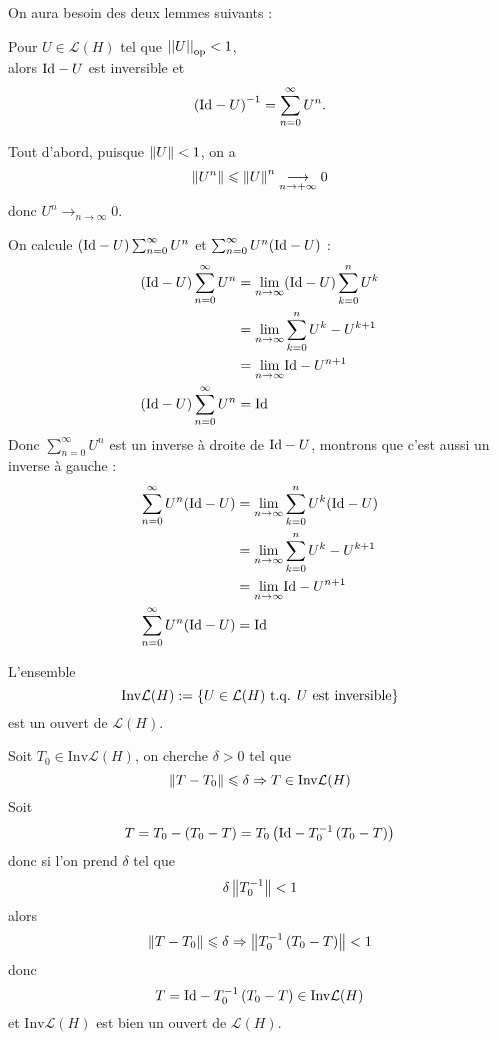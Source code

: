 \documentclass[a4paper,11pt, twoside]{article}
\begin{document}
On aura besoin des deux lemmes suivants : 


\begin{lemme}
  Pour $U\in\mathcal L(H)$ tel que $\left|\left|U\right|\right|_{\mathrm{op}}<1$,\\

  alors $\mathrm{Id}-U$ est inversible et 
  $$\left(\mathrm{Id}-U\right)^{-1}=\sum_{n=0}^{\infty}U^n.$$
\end{lemme}


\begin{Proof}
  Tout d'abord, puisque $\left\lVert U\right\rVert<1$, on a 
  $$\left\lVert U^n\right\rVert\leqslant \left\lVert U\right\rVert^n\underset{n\to+\infty}{\longrightarrow} 0$$
  donc $U^n\longrightarrow_{n\to\infty}0$.

  On calcule $(\mathrm{Id}-U)\sum_{n=0}^{\infty}U^n$ et $\sum_{n=0}^{\infty}U^n(\mathrm{Id}-U)$ :
  \begin{align*}
    (\mathrm{Id}-U)\sum_{n=0}^{\infty}U^n&=\underset{n\to\infty}{\mathrm{lim}} (\mathrm{Id}-U)\sum_{k=0}^{n}U^k\\
    &=\underset{n\to\infty}{\mathrm{lim}} \sum_{k=0}^{n}U^k-U^{k+1}\\
    &=\underset{n\to\infty}{\mathrm{lim}} \mathrm{Id}-U^{n+1}\\
    (\mathrm{Id}-U)\sum_{n=0}^{\infty}U^n&=\mathrm{Id}
  \end{align*}
  Donc $\sum_{n=0}^{\infty}U^n$ est un inverse à droite de $\mathrm{Id}-U$, montrons que c'est aussi un inverse à gauche :
  \begin{align*}
    \sum_{n=0}^{\infty}U^n(\mathrm{Id}-U)&=\underset{n\to\infty}{\mathrm{lim}} \sum_{k=0}^{n}U^k(\mathrm{Id}-U)\\
    &=\underset{n\to\infty}{\mathrm{lim}} \sum_{k=0}^{n}U^k-U^{k+1}\\
    &=\underset{n\to\infty}{\mathrm{lim}} \mathrm{Id}-U^{n+1}\\
    \sum_{n=0}^{\infty}U^n(\mathrm{Id}-U)&=\mathrm{Id}
  \end{align*}
\end{Proof}


\begin{lemme}
  L'ensemble 
  $$\mathrm{Inv}\mathcal L(H):=\left\{U\in\mathcal L(H)\text{ t.q. } U\text{ est inversible}\right\}$$
  est un ouvert de $\mathcal L(H).$
\end{lemme}


\begin{Proof}
  Soit $T_0\in\mathrm{Inv}\mathcal L(H)$, on cherche $\delta>0$ tel que 
  $$\left\lVert T-T_0\right\rVert\leqslant \delta\Rightarrow T\in\mathrm{Inv}\mathcal L(H)$$
  Soit 
  $$T=T_0-(T_0-T)=T_0\left(\mathrm{Id}-T_0^{-1}\left(T_0-T\right)\right)$$
  donc 
  si l'on prend $\delta$ tel que 
  $$\delta\left\lVert T_0^{-1}\right\rVert<1$$
  alors $$\left\lVert T-T_0\right\rVert\leqslant \delta\Rightarrow\left\lVert T_0^{-1}\left(T_0-T\right)\right\rVert<1$$ 
  donc
  $$T=\mathrm{Id}-T_0^{-1}\left(T_0-T\right)\in\mathrm{Inv}\mathcal L(H)$$ 
  et $\mathrm{Inv}\mathcal L(H)$ est bien un ouvert de $\mathcal L(H)$.
\end{Proof} 
\end{document}
